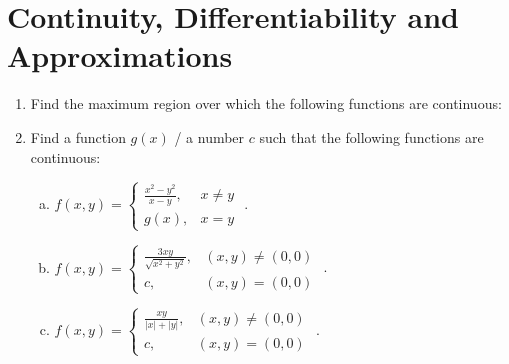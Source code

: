 \documentclass[journal,12pt,twocolumn]{IEEEtran}
\begin{document}
\section{Continuity, Differentiability and Approximations}
\begin{enumerate}

\item Find the maximum region over which the following functions are continuous:

\begin{enumerate}[(i)]
\end{enumerate}


\item Find a function $g(x)$ / a number $c$ such that the following functions are continuous:

\begin{enumerate}[(a)]

\item $
 f(x,y)=\begin{cases}
\frac{x^2-y^2}{x-y},& x \neq y \\
g(x),& x = y
\end{cases}
$ .

\item $
f(x,y)=\begin{cases}
\frac{3xy}{\sqrt{x^2+y^2}},& (x,y) \neq (0,0) \\
c,& (x,y) = (0,0)
\end{cases}
$ .

\item $
f(x,y)=\begin{cases}
\frac{xy}{|x|+|y|},& (x,y) \neq (0,0) \\
c,& (x,y) = (0,0)
\end{cases}
$ .


\end{enumerate}
\end{enumerate}
\end{document}

